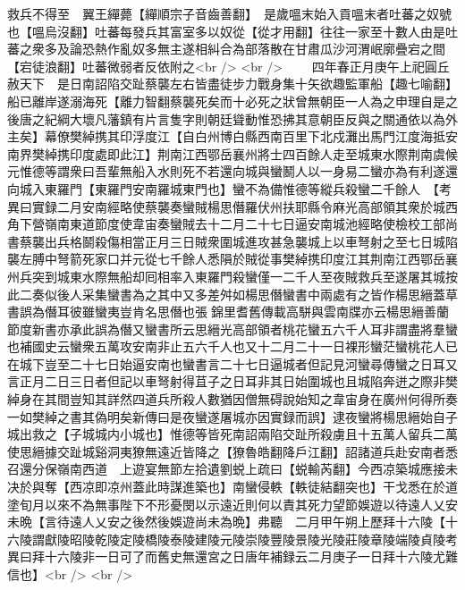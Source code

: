 救兵不得至　翼王繟薨【繟順宗子音齒善翻】　是歲嗢末始入貢嗢末者吐蕃之奴號也【嗢烏沒翻】吐蕃每發兵其富室多以奴從【從才用翻】往往一家至十數人由是吐蕃之衆多及論恐熱作亂奴多無主遂相糾合為部落散在甘肅瓜沙河渭岷廓疊宕之間【宕徒浪翻】吐蕃微弱者反依附之<br />
<br />
　　四年春正月庚午上祀圓丘赦天下　是日南詔陷交趾蔡襲左右皆盡徒步力戰身集十矢欲趣監軍船【趣七喻翻】船已離岸遂溺海死【離力智翻蔡襲死矣而十必死之狀曾無朝臣一人為之申理自是之後唐之紀綱大壞凡藩鎮有片言隻字則朝廷聳動惟恐拂其意朝臣反與之關通依以為外主矣】幕僚樊綽携其印浮度江【自白州博白縣西南百里下北戍灘出馬門江度海抵安南界樊綽携印度處即此江】荆南江西鄂岳襄州將士四百餘人走至城東水際荆南虞候元惟德等謂衆曰吾輩無船入水則死不若還向城與蠻鬭人以一身易二蠻亦為有利遂還向城入東羅門【東羅門安南羅城東門也】蠻不為備惟德等縱兵殺蠻二千餘人　【考異曰實録二月安南經略使蔡襲奏蠻賊楊思僭羅伏州扶耶縣令麻光高部領其衆於城西角下營嶺南東道節度使韋宙奏蠻賊去十二月二十七日逼安南城池經略使檢校工部尚書蔡襲出兵格鬬殺傷相當正月三日賊衆圍城進攻甚急襲城上以車弩射之至七日城陷襲左膊中弩箭死家口并元從七千餘人悉隕於賊從事樊綽携印度江其荆南江西鄂岳襄州兵突到城東水際無船却囘相率入東羅門殺蠻僅一二千人至夜賊救兵至遂屠其城按此二奏似後人采集蠻書為之其中又多差舛如楊思僭蠻書中兩處有之皆作楊思縉蓋草書誤為僭耳彼雖蠻夷豈肯名思僭也張錦里耆舊傳載高駢與雲南牒亦云楊思縉善蘭節度新書亦承此誤為僭又蠻書所云思縉光高部領者桃花蠻五六千人耳非謂盡將羣蠻也補國史云蠻衆五萬攻安南非止五六千人也又十二月二十一日裸形蠻茫蠻桃花人已在城下豈至二十七日始逼安南也蠻書言二十七日逼城者但記見河蠻尋傳蠻之日耳又言正月二日三日者但記以車弩射得苴子之日耳非其日始圍城也且城陷奔迸之際非樊綽身在其間豈知其詳然四道兵所殺人數猶因僧無碍說始知之韋宙身在廣州何得所奏一如樊綽之書其偽明矣新傳曰是夜蠻遂屠城亦因實録而誤】逮夜蠻將楊思縉始自子城出救之【子城城内小城也】惟德等皆死南詔兩陷交趾所殺虜且十五萬人留兵二萬使思縉據交趾城谿洞夷獠無遠近皆降之【獠魯皓翻降戶江翻】詔諸道兵赴安南者悉召還分保嶺南西道　上遊宴無節左拾遺劉蜕上疏曰【蜕輸芮翻】今西凉築城應接未决於與奪【西凉即凉州蓋此時謀進築也】南蠻侵軼【軼徒結翻突也】干戈悉在於道塗旬月以來不為無事陛下不形憂閔以示遠近則何以責其死力望節娛遊以待遠人乂安未晩【言待遠人乂安之後然後娛遊尚未為晩】弗聽　二月甲午朔上歷拜十六陵【十六陵謂獻陵昭陵乾陵定陵橋陵泰陵建陵元陵崇陵豐陵景陵光陵莊陵章陵端陵貞陵考異曰拜十六陵非一日可了而舊史無還宮之日唐年補録云二月庚子一日拜十六陵尤難信也】<br />
<br />
